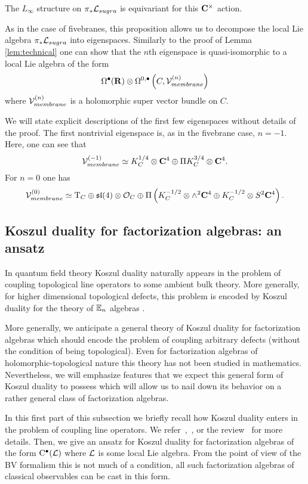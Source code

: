 \documentclass[11pt]{amsart}
\begin{document}
\begin{prop}
The $L_\infty$ structure on $\pi_* \mathcal L_{sugra}$ is equivariant for this $\mathbf{C}^\times$ action. 
\end{prop}

As in the case of fivebranes, this proposition allows us to decompose the local Lie algebra $\pi_* \mathcal L_{sugra}$ into eigenspaces. 
Similarly to the proof of Lemma \ref{lem:technical} one can show that the $n$th eigenspace is quasi-isomorphic to a local Lie algebra of the form
\[
\Omega^\bullet(\mathbf{R}) \otimes \Omega^{0,\bullet}\left(C, \mathcal V_{membrane}^{(n)}\right)
\]
where $\mathcal V^{(n)}_{membrane}$ is a holomorphic super vector bundle on $C$.

We will state explicit descriptions of the first few eigenspaces without details of the proof. 
The first nontrivial eigenspace is, as in the fivebrane case, $n=-1$. 
Here, one can see that 
\[
\mathcal V^{(-1)}_{membrane} \simeq K_{C}^{1/4} \otimes \mathbf{C}^4 \oplus \Pi K^{3/4}_C \otimes \mathbf{C}^4 .
\]
For $n=0$ one has 
\[
\mathcal V^{(0)}_{membrane} \simeq {\rm T}_C \oplus \mathfrak{sl}(4) \otimes \mathcal O_C \oplus \Pi \left(K^{-1/2}_C \otimes \wedge^2 \mathbf{C}^4 \oplus K^{-1/2}_C \otimes S^2 \mathbf{C}^4\right) .
\]
\subsection{Koszul duality for factorization algebras: an ansatz} 

In quantum field theory Koszul duality naturally appears in the problem of coupling topological line operators to some ambient bulk theory. 
More generally, for higher dimensional topological defects, this problem is encoded by Koszul duality for the theory of $\mathbb E_n$ algebras \cite{??}.

More generally, we anticipate a general theory of Koszul duality for factorization algebras which should encode the problem of coupling arbitrary defects (without the condition of being topological).
Even for factorization algebras of holomorphic-topological nature this theory has not been studied in mathematics. 
Nevertheless, we will emphasize features that we expect this general form of Koszul duality to possess which will allow us to nail down its behavior on a rather general class of factorization algebras. 

In this first part of this subsection we briefly recall how Koszul duality enters in the problem of coupling line operators. 
We refer~\cite[\S 6]{CP1},~\cite[\S ??]{CG1}, or the review~\cite{PWkoszul} for more details. 
Then, we give an ansatz for Koszul duality for factorization algebras of the form ${\rm C}^\bullet(\mathcal L)$ where $\mathcal L$ is some local Lie algebra. 
From the point of view of the BV formalism this is not much of a condition, all such factorization algebras of classical observables can be cast in this form. 
\end{document}
